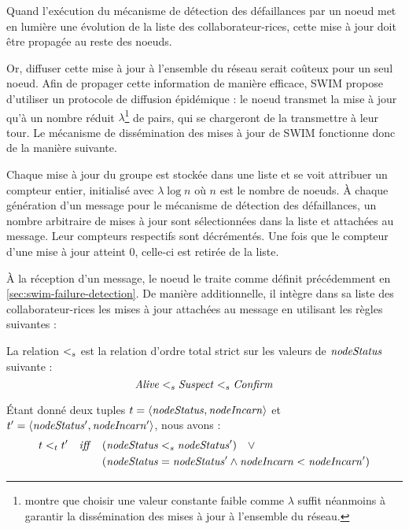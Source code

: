 \label{sec:swim-update-dissemination}

Quand l'exécution du mécanisme de détection des défaillances par un noeud met en lumière une évolution de la liste des collaborateur-rices, cette mise à jour doit être propagée au reste des noeuds.

Or, diffuser cette mise à jour à l'ensemble du réseau serait coûteux pour un seul noeud.
Afin de propager cette information de manière efficace, SWIM propose d'utiliser un protocole de diffusion épidémique : le noeud transmet la mise à jour qu'à un nombre réduit $\lambda$\footnote{
  \cite{swim2002} montre que choisir une valeur constante faible comme $\lambda$ suffit néanmoins à garantir la dissémination des mises à jour à l'ensemble du réseau.
} de pairs, qui se chargeront de la transmettre à leur tour.
Le mécanisme de dissémination des mises à jour de SWIM fonctionne donc de la manière suivante.

Chaque mise à jour du groupe est stockée dans une liste et se voit attribuer un compteur entier, initialisé avec $\lambda \log{} n$ où $n$ est le nombre de noeuds.
À chaque génération d'un message pour le mécanisme de détection des défaillances, un nombre arbitraire de mises à jour sont sélectionnées dans la liste et attachées au message.
Leur compteurs respectifs sont décrémentés.
Une fois que le compteur d'une mise à jour atteint 0, celle-ci est retirée de la liste.

À la réception d'un message, le noeud le traite comme définit précédemment en \autoref{sec:swim-failure-detection}.
De manière additionnelle, il intègre dans sa liste des collaborateur-rices les mises à jour attachées au message en utilisant les règles suivantes :

\begin{definition}
  La relation $<_{s}$ est la relation d'ordre total strict sur les valeurs de $\mathit{nodeStatus}$ suivante :
  \begin{equation*}
    \mathit{Alive} <_{s} \mathit{Suspect} <_{s} \mathit{Confirm}
  \end{equation*}
\end{definition}

\begin{definition}
  Étant donné deux tuples $t = \langle \mathit{nodeStatus},\mathit{nodeIncarn} \rangle$ et $t' = \langle \mathit{nodeStatus'},\mathit{nodeIncarn'} \rangle$, nous avons :
  \begin{equation*}
    \begin{split}
      t <_{t} t' \quad \mathit{iff} \quad  & (\mathit{nodeStatus} <_{s} \mathit{nodeStatus'}) \quad \lor \\
                                          & (\mathit{nodeStatus} = \mathit{nodeStatus'} \land \mathit{nodeIncarn} < \mathit{nodeIncarn'}) \\
    \end{split}
  \end{equation*}
\end{definition}

